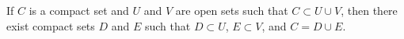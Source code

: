 If $C$ is a compact set and $U$ and $V$ are open sets such that $C \subset U \cup V$, then there exist compact sets $D$ and $E$ such that $D \subset U$, $E \subset V$, and $C = D \cup E$.
